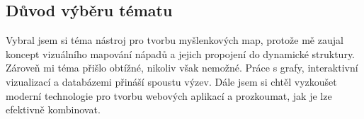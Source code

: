 \subsection{Důvod výběru tématu}
Vybral jsem si téma nástroj pro tvorbu myšlenkových map, protože mě zaujal koncept vizuálního mapování nápadů a jejich propojení do dynamické struktury. Zároveň mi téma přišlo obtížné, nikoliv však nemožné. Práce s grafy, interaktivní vizualizací a databázemi přináší spoustu výzev. Dále jsem si chtěl vyzkoušet moderní technologie pro tvorbu webových aplikací a prozkoumat, jak je lze efektivně kombinovat.